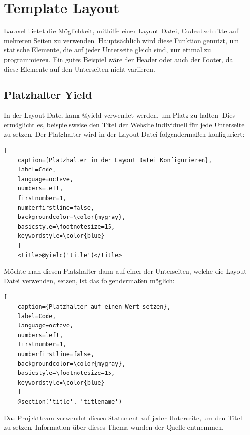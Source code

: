\section{Template Layout}\label{sec: Layout}
Laravel bietet die Möglichkeit, mithilfe einer Layout Datei, Codeabschnitte auf mehreren Seiten zu verwenden. Hauptsächlich wird diese Funktion genutzt, um statische Elemente, die auf jeder Unterseite gleich sind, nur einmal zu programmieren. Ein gutes Beispiel wäre der Header oder auch der Footer, da diese Elemente auf den Unterseiten nicht variieren. 

\subsection{Platzhalter Yield}
In der Layout Datei kann @yield verwendet werden, um Platz zu halten. Dies ermöglicht es, beispielsweise den Titel der Website individuell für jede Unterseite zu setzen. Der Platzhalter wird in der Layout Datei folgendermaßen konfiguriert: 
\renewcommand{\lstlistingname}{Quellcode}

\begin{lstlisting}[
	caption={Platzhalter in der Layout Datei Konfigurieren},
	label=Code,
	language=octave,
	numbers=left,
	firstnumber=1,
	numberfirstline=false,
	backgroundcolor=\color{mygray},
	basicstyle=\footnotesize=15,
	keywordstyle=\color{blue}
	]
	<title>@yield('title')</title>
\end{lstlisting} 
Möchte man diesen Platzhalter dann auf einer der Unterseiten, welche die Layout Datei verwenden, setzen, ist das folgendermaßen möglich:
\begin{lstlisting}[
	caption={Platzhalter auf einen Wert setzen},
	label=Code,
	language=octave,
	numbers=left,
	firstnumber=1,
	numberfirstline=false,
	backgroundcolor=\color{mygray},
	basicstyle=\footnotesize=15,
	keywordstyle=\color{blue}
	]
	@section('title', 'titlename')
\end{lstlisting} 
Das Projektteam verwendet dieses Statement auf jeder Unterseite, um den Titel zu setzen. Information über dieses Thema wurden der Quelle \cite{yield} entnommen.

